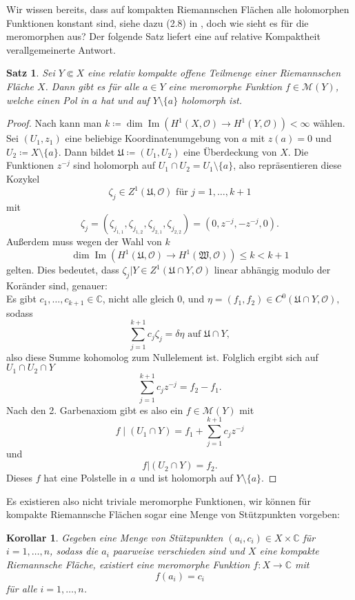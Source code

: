 \documentclass[11pt,a4paper,toc=bibliography]{scrartcl}
\theoremstyle{def}
\theoremstyle{thm}
\newtheorem{satz}[defi]{Satz}
\newtheorem{koro}[defi]{Korollar}
\theoremstyle{remark}
\DeclareMathOperator{\Ima}{Im}
\begin{document}
Wir wissen bereits, dass auf kompakten Riemannschen Flächen alle holomorphen Funktionen konstant sind, siehe dazu (2.8) in \cite[~S.10]{forster}, doch wie sieht es für die meromorphen aus? Der folgende Satz liefert eine auf relative Kompaktheit verallgemeinerte Antwort.
\begin{satz}
Sei $Y\Subset X$ eine relativ kompakte offene Teilmenge einer Riemannschen Fläche $X$. Dann gibt es für alle $a\in Y$ eine meromorphe Funktion $f\in \mathcal{M}(Y)$, welche einen Pol in $a$ hat und auf $Y\setminus\{ a \}$ holomorph ist.
\end{satz}
\begin{proof}
Nach  kann man $k\coloneqq \dim\Ima \left(H^1(X,\mathcal{O})\rightarrow H^1(Y,\mathcal{O})\right)<\infty $ wählen.
Sei $(U_1,z_1)$ eine beliebige Koordinatenumgebung von $a$ mit $z(a)=0$ und $U_2 \coloneqq X\setminus \{ a \}$. Dann bildet $\mathfrak{U}\coloneqq (U_1,U_2)$ eine Überdeckung von $X$. Die Funktionen $z^{-j}$ sind holomorph auf $U_1\cap U_2= U_1\setminus\{ a \}$, also repräsentieren diese Kozykel
\[
\zeta_j \in Z^1(\mathfrak{U},\mathcal{O})\text{ für } j=1,\ldots,k+1
\]
mit 
\[
\zeta_j =(\zeta_{j_{1,1}},\zeta_{j_{1,2}},\zeta_{j_{2,1}},\zeta_{j_{2,2}})=(0,z^{-j},-z^{-j},0).
\]
Außerdem muss wegen der Wahl von $k$
\[
\dim\Ima \left(H^1(\mathfrak{U},\mathcal{O})\rightarrow H^1(\mathfrak{W},\mathcal{O})\right)\leq k<k+1
\]
gelten. Dies bedeutet, dass $\zeta_j|Y \in Z^1(\mathfrak{U}\cap Y,\mathcal{O})$ linear abhängig modulo der Koränder sind, genauer:\\
Es gibt $c_1,\dots,c_{k+1}\in\mathbb{C}$, nicht alle gleich $0$, und $\eta =(f_1,f_2)\in C^0(\mathfrak{U}\cap Y,\mathcal{O}),$ sodass
\[
\sum_{j=1}^{k+1} c_j\zeta_j = \delta\eta \text{ auf } \mathfrak{U}\cap Y,
\]
also diese Summe kohomolog zum Nullelement ist. Folglich ergibt sich auf $U_1\cap U_2\cap Y$
\[
\sum_{j=1}^{k+1}c_j z^{-j} = f_2 - f_1.
\]
Nach den 2. Garbenaxiom gibt es also ein $f\in \mathcal{M}(Y)$ mit \[f\mid (U_1\cap Y) =f_1 + \sum_{j=1}^{k+1}c_j z^{-j}\]
und 
\[
f|(U_2\cap Y) = f_2.
\]
Dieses $f$ hat eine Polstelle in $a$ und ist holomorph auf $Y\setminus \{ a \}$.
\end{proof}
Es existieren also nicht triviale meromorphe Funktionen, wir können für kompakte Riemannsche Flächen sogar eine Menge von Stützpunkten vorgeben:
\begin{koro}
Gegeben eine Menge von Stützpunkten $(a_i,c_i)\in X\times \mathbb{C}$ für $i=1,\ldots,n$, sodass die $a_i$ paarweise verschieden sind und $X$ eine kompakte Riemannsche Fläche, existiert eine meromorphe Funktion $f:X\rightarrow \mathbb{C}$ mit
\[
f(a_i)=c_i
\]
für alle $i=1,\ldots,n$.

\end{koro}
\end{document}
